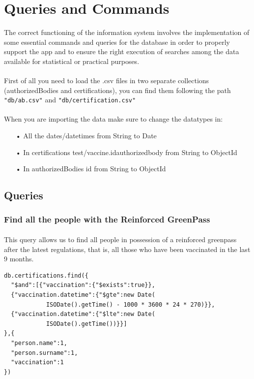 \documentclass[a4paper,12pt]{article}
\begin{document}
\section{Queries and Commands}
\paragraph{} The correct functioning of the information system involves the implementation of some essential commands and queries for the database in order to properly support the app and to ensure the right execution of searches among the data available for statistical or practical purposes. \par
\paragraph{} First of all you need to load the .csv files in two separate collections (authorizedBodies and certifications), you can find them following the path \texttt{"db/ab.csv"} and \texttt{"db/certification.csv"}
\paragraph{}When you are importing the data make sure to change the datatypes in:
\begin{itemize}
\item[•] All the dates/datetimes from String to Date
\item[•] In certifications test/vaccine.id\textunderscore authorized\textunderscore body from String to ObjectId
\item[•] In authorizedBodies \textunderscore id from String to ObjectId
\end{itemize}

\subsection{Queries}
\subsubsection{Find all the people with the Reinforced GreenPass}
\paragraph{} This query allows us to find all people in possession of a reinforced greenpass after the latest regulations, that is, all those who have been vaccinated in the last 9 months.
\begin{tcolorbox}[colback=green!5!white,colframe=green!75!black,title=QUERY]
\begin{verbatim}
db.certifications.find({
  "$and":[{"vaccination":{"$exists":true}},
  {"vaccination.datetime":{"$gte":new Date(
            ISODate().getTime() - 1000 * 3600 * 24 * 270)}},
  {"vaccination.datetime":{"$lte":new Date(
            ISODate().getTime())}}]
},{
  "person.name":1,
  "person.surname":1,
  "vaccination":1
})
\end{verbatim}
\end{tcolorbox}
\end{document}
